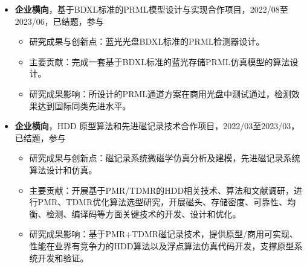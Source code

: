 \documentclass[zh]{resume}
\begin{document}
\begin{itemize}
  \item \textbf{企业横向}，基于BDXL标准的PRML模型设计与实现合作项目，2022/08至2023/06，已结题，参与
  \begin{itemize}
    \item 研究成果与创新点：蓝光光盘BDXL标准的PRML检测器设计。
    \item 主要贡献：完成一套基于BDXL标准的蓝光存储PRML仿真模型的算法设计。
    \item 研究成果影响：所设计的PRML通道方案在商用光盘中测试通过，检测效果达到国际同类先进水平。
  \end{itemize}

  \item \textbf{企业横向}，HDD 原型算法和先进磁记录技术合作项目，2022/03至2023/03，已结题，参与
  \begin{itemize}
    \item 研究成果与创新点：磁记录系统微磁学仿真分析及建模，先进磁记录系统算法设计和仿真。
    \item 主要贡献：开展基于PMR/TDMR的HDD相关技术、算法和文献调研，进行PMR、TDMR优化算法选型研究，开展磁头、存储密度、可靠性、均衡、检测、编译码等方面关键技术的开发、设计和优化。
    \item 研究成果影响：基于PMR+TDMR磁记录技术，提供原型/商用可实现、性能在业界有竞争力的HDD算法以及浮点算法仿真代码开发，支撑原型系统开发和验证。
  \end{itemize}
\end{itemize}

\end{document}
